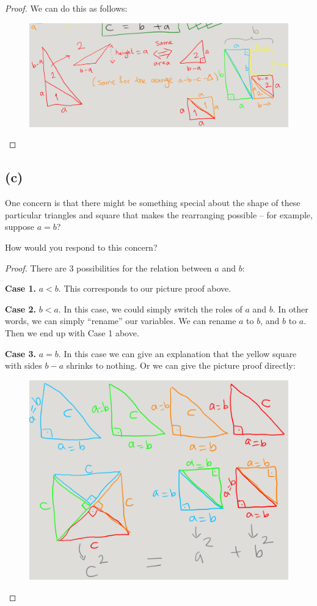 \documentclass[14pt]{extarticle}
\begin{document}
\begin{proof}
We can do this as follows:
\begin{figure}[ht!]
\centering
\includegraphics[scale=0.20]{twosquares.png}
\end{figure}
\end{proof}

\subsection{(c)}

One concern is that there might be something special about the shape of these particular triangles and square that makes the rearranging possible -- for example, suppose $a = b$?

How would you respond to this concern?

\begin{proof} 
There are 3 possibilities for the relation between $a$ and $b$:

{\bf Case 1.} $a < b$. This corresponds to our picture proof above.

{\bf Case 2.} $b < a$. In this case, we could simply switch the roles of $a$ and $b$. In other words, we can simply ``rename'' our variables. We can rename $a$ to $b$, and $b$ to $a$. Then we end up with Case 1 above.

{\bf Case 3.} $a = b$. In this case we can give an explanation that the yellow square with sides $b - a$ shrinks to nothing. Or we can give the picture proof directly:

\begin{figure}[ht!]
\centering
\includegraphics[scale=0.25]{aequalsb.png}
\end{figure}
\end{proof}
\end{document}
